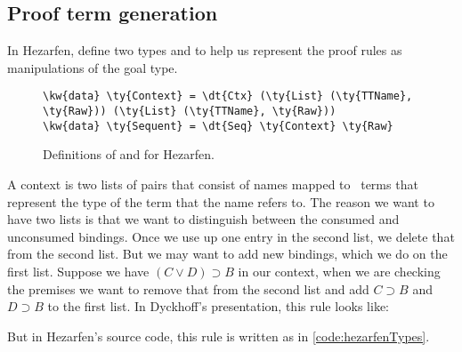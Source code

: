 \subsection{Proof term generation}

In Hezarfen, define two types  and  to help us
represent the proof rules as manipulations of the goal type.

\begin{figure}[ht]
\caption{Definitions of  and  for Hezarfen.}
\label{code:hezarfenTypes}
\begin{Verbatim}[framesep=2mm, label=\footnotesize{\normalfont{Idris}}, labelposition=topline]
\kw{data} \ty{Context} = \dt{Ctx} (\ty{List} (\ty{TTName}, \ty{Raw})) (\ty{List} (\ty{TTName}, \ty{Raw}))
\kw{data} \ty{Sequent} = \dt{Seq} \ty{Context} \ty{Raw}
\end{Verbatim}
\end{figure}

A context is two lists of pairs that consist of names mapped to \Raw\ terms
that represent the type of the term that the name refers to.
The reason we want to have two lists is that we want to distinguish between the
consumed and unconsumed bindings. Once we use up one entry in the second list,
we delete that from the second list. But we may want to add new bindings, which
we do on the first list. Suppose we have $(C \vee D) \supset B$ in our context,
when we are checking the premises we want to remove that from the second list
and add $C \supset B$ and $D \supset B$ to the first list. In Dyckhoff's
presentation, this rule looks like:

\begin{prooftree}
\end{prooftree}
\vspace{\baselineskip}

But in Hezarfen's source code, this rule is written as in \autoref{code:hezarfenTypes}.

